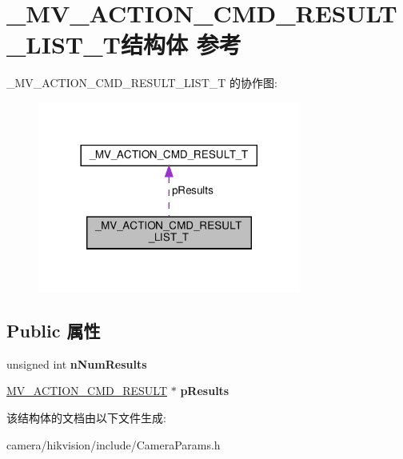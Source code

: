 \hypertarget{struct___m_v___a_c_t_i_o_n___c_m_d___r_e_s_u_l_t___l_i_s_t___t}{}\section{\+\_\+\+M\+V\+\_\+\+A\+C\+T\+I\+O\+N\+\_\+\+C\+M\+D\+\_\+\+R\+E\+S\+U\+L\+T\+\_\+\+L\+I\+S\+T\+\_\+\+T结构体 参考}
\label{struct___m_v___a_c_t_i_o_n___c_m_d___r_e_s_u_l_t___l_i_s_t___t}


\+\_\+\+M\+V\+\_\+\+A\+C\+T\+I\+O\+N\+\_\+\+C\+M\+D\+\_\+\+R\+E\+S\+U\+L\+T\+\_\+\+L\+I\+S\+T\+\_\+T 的协作图\+:\nopagebreak
\begin{figure}[H]
\begin{center}
\leavevmode
\includegraphics[width=245pt]{struct___m_v___a_c_t_i_o_n___c_m_d___r_e_s_u_l_t___l_i_s_t___t__coll__graph}
\end{center}
\end{figure}
\subsection*{Public 属性}
\begin{DoxyCompactItemize}
\item 
\mbox{\label{struct___m_v___a_c_t_i_o_n___c_m_d___r_e_s_u_l_t___l_i_s_t___t_a57452d900f58fe3c1eb9e8b60c1f77b3}} 
unsigned int {\bfseries n\+Num\+Results}
\item 
\mbox{\label{struct___m_v___a_c_t_i_o_n___c_m_d___r_e_s_u_l_t___l_i_s_t___t_a9b1885e995f66a512450edadb8681331}} 
\hyperlink{struct___m_v___a_c_t_i_o_n___c_m_d___r_e_s_u_l_t___t}{M\+V\+\_\+\+A\+C\+T\+I\+O\+N\+\_\+\+C\+M\+D\+\_\+\+R\+E\+S\+U\+LT} $\ast$ {\bfseries p\+Results}
\end{DoxyCompactItemize}


该结构体的文档由以下文件生成\+:\begin{DoxyCompactItemize}
\item 
camera/hikvision/include/Camera\+Params.\+h\end{DoxyCompactItemize}
